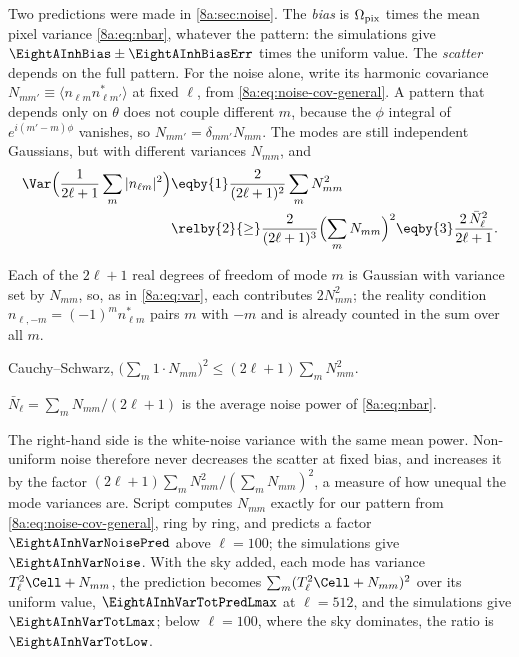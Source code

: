 Two predictions were made in \cref{8a:sec:noise}. The \emph{bias} is $\Omega_{\rm pix}$ times
the mean pixel variance \eqref{8a:eq:nbar}, whatever the pattern: the simulations give
$\EightAInhBias\pm\EightAInhBiasErr$ times the uniform value. The \emph{scatter} depends on the full
pattern. For the noise alone, write its harmonic covariance
$N_{mm'}\equiv\langle n_{\ell m}n^*_{\ell m'}\rangle$ at fixed $\ell$, from
\eqref{8a:eq:noise-cov-general}. A pattern that depends only on $\theta$ does not couple
different $m$, because the $\phi$ integral of $e^{i(m'-m)\phi}$ vanishes, so $N_{mm'}=\delta_{mm'}N_{mm}$.
The modes are still independent Gaussians, but with different variances $N_{mm}$, and
\begin{align}
  \Var\Bigl(\frac{1}{2\ell+1}\sum_m|n_{\ell m}|^2\Bigr)
  &\eqby{1}\frac{2}{(2\ell+1)^2}\sum_mN_{mm}^2
  \nonumber\\
  &\relby{2}{\ge}\frac{2}{(2\ell+1)^3}\Bigl(\sum_mN_{mm}\Bigr)^2
   \eqby{3}\frac{2\,\bar N_\ell^2}{2\ell+1} .
  \label{8a:eq:var-inh}
\end{align}
\begin{explain}
  \item Each of the $2\ell+1$ real degrees of freedom of mode $m$ is Gaussian with variance set
        by $N_{mm}$, so, as in \eqref{8a:eq:var}, each contributes $2N_{mm}^2$; the reality
        condition $n_{\ell,-m}=(-1)^mn^*_{\ell m}$ pairs $m$ with $-m$ and is already counted in the
        sum over all $m$.
  \item Cauchy--Schwarz, $\bigl(\sum_m1\cdot N_{mm}\bigr)^2\le(2\ell+1)\sum_mN_{mm}^2$.
  \item $\bar N_\ell=\sum_mN_{mm}/(2\ell+1)$ is the average noise power of \eqref{8a:eq:nbar}.
\end{explain}
The right-hand side is the white-noise variance with the same mean power. Non-uniform noise
therefore never decreases the scatter at fixed bias, and increases it by the factor
$(2\ell+1)\sum_mN_{mm}^2/(\sum_mN_{mm})^2$, a measure of how unequal the mode variances are.
Script  computes $N_{mm}$ exactly for our pattern from
\eqref{8a:eq:noise-cov-general}, ring by ring, and predicts a factor $\EightAInhVarNoisePred$
above $\ell=100$; the simulations give $\EightAInhVarNoise$. With the sky added, each mode has
variance $T_\ell^2\Cell+N_{mm}$, the prediction becomes $\sum_m(T_\ell^2\Cell+N_{mm})^2$ over its
uniform value, $\EightAInhVarTotPredLmax$ at $\ell=512$, and the simulations give
$\EightAInhVarTotLmax$; below $\ell=100$, where the sky dominates, the ratio is
$\EightAInhVarTotLow$.

